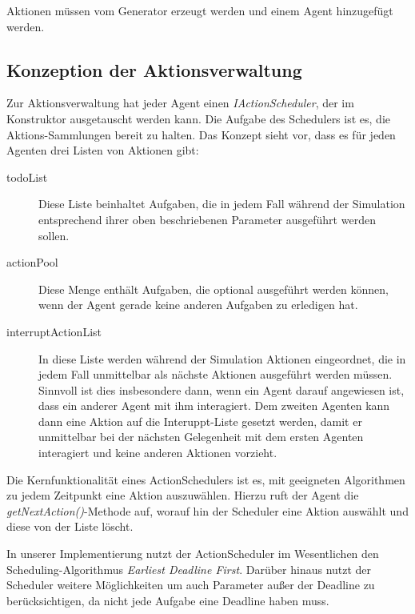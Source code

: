 Aktionen müssen vom Generator erzeugt werden und einem Agent hinzugefügt werden.

\subsection{Konzeption der Aktionsverwaltung}\label{subsec:concept_actionhandling}
Zur Aktionsverwaltung hat jeder Agent einen \emph{IActionScheduler}, der im Konstruktor ausgetauscht werden kann. Die Aufgabe des Schedulers ist es, die Aktions-Sammlungen bereit zu halten. Das Konzept sieht vor, dass es für jeden Agenten drei Listen von Aktionen gibt:
\begin{description}
	\item[todoList] Diese Liste beinhaltet Aufgaben, die in jedem Fall während der Simulation entsprechend ihrer oben beschriebenen Parameter ausgeführt werden sollen.
	\item[actionPool] Diese Menge enthält Aufgaben, die optional ausgeführt werden können, wenn der Agent gerade keine anderen Aufgaben zu erledigen hat.
	\item[interruptActionList] In diese Liste werden während der Simulation Aktionen eingeordnet, die in jedem Fall unmittelbar als nächste Aktionen ausgeführt werden müssen. Sinnvoll ist dies insbesondere dann, wenn ein Agent darauf angewiesen ist, dass ein anderer Agent mit ihm interagiert. Dem zweiten Agenten kann dann eine Aktion auf die Interuppt-Liste gesetzt werden, damit er unmittelbar bei der nächsten Gelegenheit mit dem ersten Agenten interagiert und keine anderen Aktionen vorzieht.
\end{description}

Die Kernfunktionalität eines ActionSchedulers ist es, mit geeigneten Algorithmen zu jedem Zeitpunkt eine Aktion auszuwählen. Hierzu ruft der Agent die \emph{getNextAction()}-Methode auf, worauf hin der Scheduler eine Aktion auswählt und diese von der Liste löscht.

In unserer Implementierung nutzt der ActionScheduler im Wesentlichen den Scheduling-Algorithmus \emph{Earliest Deadline First}. Darüber hinaus nutzt der Scheduler weitere Möglichkeiten um auch Parameter außer der Deadline zu berücksichtigen, da nicht jede Aufgabe eine Deadline haben muss.  



